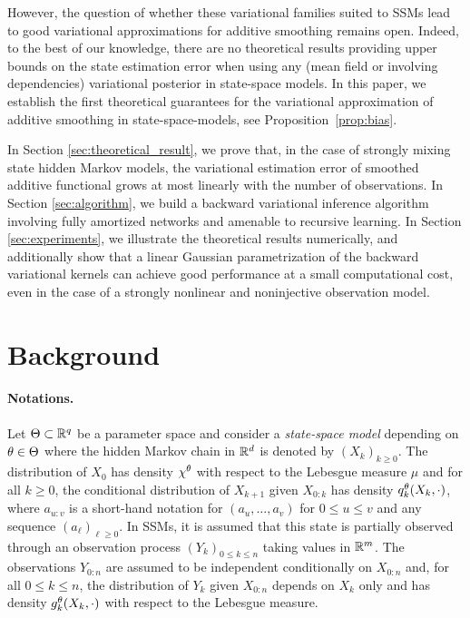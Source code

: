 \documentclass{article}
\begin{document}
However, the question of whether these variational families suited to SSMs lead to good variational approximations for additive smoothing remains open. 
Indeed, to the best of our knowledge, there are no theoretical results providing upper bounds on the state estimation error when using any (mean field or involving dependencies) variational posterior in state-space models. 
In this paper, we establish the first theoretical guarantees for the variational approximation of additive smoothing in state-space-models, see Proposition~\ref{prop:bias}.  


In Section \ref{sec:theoretical_result}, we prove that, in the case of strongly mixing state hidden Markov models, the variational estimation error of smoothed additive functional grows at most linearly with the number of observations. In Section \ref{sec:algorithm}, we build a backward variational inference algorithm involving fully amortized networks and amenable to recursive learning.  
In Section \ref{sec:experiments}, we illustrate the theoretical results numerically, and additionally show that a linear Gaussian parametrization of the backward variational kernels can achieve good performance at a small computational cost, even in the case of a strongly nonlinear and noninjective observation model.

\section{Background}
\paragraph{Notations. } Let $\Theta\subset \mathbb{R}^q$ be a parameter space and consider a  \textit{state-space model} depending on $\theta\in\Theta$ where the hidden Markov chain  in $\mathbb{R}^d$ is denoted by $(X_k)_{k\geqslant 0}$. 
The distribution of $X_0$ has density $\chi^\theta$ with respect to the Lebesgue measure $\mu$ and for all $k \geqslant 0$, the conditional distribution of $X_{k+1} $ given $X_{0:k}$ has density $q_{k}^{\theta}(X_{k},\cdot)$, where $a_{u:v}$ is a short-hand notation for $(a_u,\ldots,a_v)$ for $0\leqslant u \leqslant v$ and any sequence $(a_\ell)_{\ell\geqslant 0}$. 
In SSMs, it is assumed that this state is partially observed through an observation process $(Y_k)_{0\leqslant k \leqslant n}$ taking values in $\mathbb{R}^m$. The observations $Y_{0:n}$ are assumed to be independent conditionally on $X_{0:n}$ and, for all $0\leqslant k \leqslant n$, the distribution of $Y_k$ given $X_{0:n}$ depends on $X_k$ only and has density $g_{k}^{\theta}(X_k,\cdot)$ with respect to the Lebesgue measure. 
\end{document}
